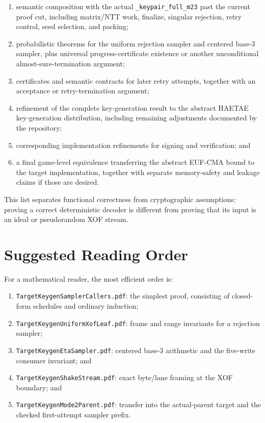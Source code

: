 \documentclass[11pt]{article}
\theoremstyle{definition}
\theoremstyle{plain}
\theoremstyle{remark}
\newcommand{\code}[1]{\nolinkurl{#1}}
\begin{document}
\begin{enumerate}
\item semantic composition with the actual \code{_keypair_full_m23} past the
  current proof cut, including matrix/NTT work, finalize, singular rejection,
  retry control, seed selection, and packing;
\item probabilistic theorems for the uniform rejection sampler and centered
  base-3 sampler, plus universal progress-certificate existence or another
  unconditional almost-sure-termination argument;
\item certificates and semantic contracts for later retry attempts, together
  with an acceptance or retry-termination argument;
\item refinement of the complete key-generation result to the abstract HAETAE
  key-generation distribution, including remaining adjustments documented by
  the repository;
\item corresponding implementation refinements for signing and verification;
  and
\item a final game-level equivalence transferring the abstract EUF-CMA bound
  to the target implementation, together with separate memory-safety and
  leakage claims if those are desired.
\end{enumerate}

This list separates functional correctness from cryptographic assumptions:
proving a correct deterministic decoder is different from proving that its
input is an ideal or pseudorandom XOF stream.

\section{Suggested Reading Order}

For a mathematical reader, the most efficient order is:

\begin{enumerate}
\item \code{TargetKeygenSamplerCallers.pdf}: the simplest proof, consisting of
  closed-form schedules and ordinary induction;
\item \code{TargetKeygenUniformXofLeaf.pdf}: frame and range invariants for a
  rejection sampler;
\item \code{TargetKeygenEtaSampler.pdf}: centered base-3 arithmetic and the
  five-write consumer invariant; and
\item \code{TargetKeygenShakeStream.pdf}: exact byte/lane framing at the XOF
  boundary; and
\item \code{TargetKeygenMode2Parent.pdf}: transfer into the actual-parent
  target and the checked first-attempt sampler prefix.
\end{enumerate}
\end{document}
